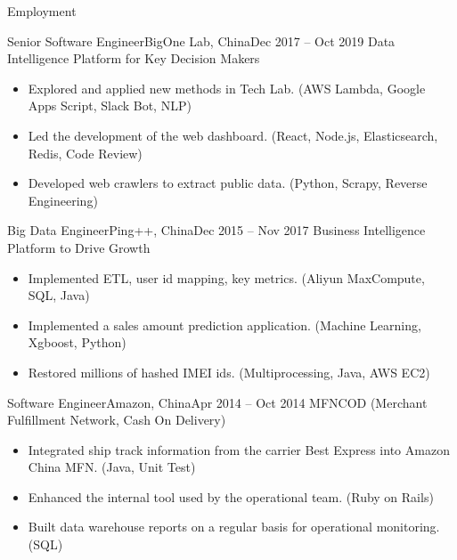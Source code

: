 \documentclass[]{mcdowellcv}
\begin{document}
	\makeheader
	
	\begin{cvsection}{Employment}
		\begin{cvsubsection}{Senior Software Engineer}{BigOne Lab, China}{Dec 2017 – Oct 2019}
			Data Intelligence Platform for Key Decision Makers
			\begin{itemize}
				\item Explored and applied new methods in Tech Lab. (AWS Lambda, Google Apps Script, Slack Bot, NLP)
				\item Led the development of the web dashboard. (React, Node.js, Elasticsearch, Redis, Code Review)
				\item Developed web crawlers to extract public data. (Python, Scrapy, Reverse Engineering)
			\end{itemize}
		\end{cvsubsection}

		\begin{cvsubsection}{Big Data Engineer}{Ping++, China}{Dec 2015 – Nov 2017}
			Business Intelligence Platform to Drive Growth
			\begin{itemize}
				\item Implemented ETL, user id mapping, key metrics. (Aliyun MaxCompute, SQL, Java)
				\item Implemented a sales amount prediction application. (Machine Learning, Xgboost, Python)
				\item Restored millions of hashed IMEI ids. (Multiprocessing, Java, AWS EC2)
			\end{itemize}
		\end{cvsubsection}
		
		\begin{cvsubsection}{Software Engineer}{Amazon, China}{Apr 2014 – Oct 2014}
			MFNCOD (Merchant Fulfillment Network, Cash On Delivery)
			\begin{itemize}
				\item Integrated ship track information from the carrier Best Express into Amazon China MFN. (Java, Unit Test)
				\item Enhanced the internal tool used by the operational team. (Ruby on Rails)
				\item Built data warehouse reports on a regular basis for operational monitoring. (SQL)
			\end{itemize}
		\end{cvsubsection}
		

\end{cvsection}
\end{document}
